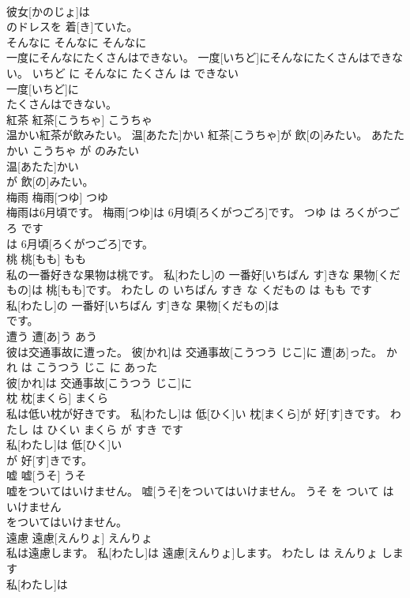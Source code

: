 \documentclass[8pt]{extreport}
\begin{document}
\begin{CJK}{UTF8}{min}
\\	彼女[かのじょ]は
\\	のドレスを 着[き]ていた。			
\\	そんなに	そんなに	そんなに	
\\	一度にそんなにたくさんはできない。	一度[いちど]にそんなにたくさんはできない。	いちど に そんなに たくさん は できない	
\\	一度[いちど]に
\\	たくさんはできない。			
\\	紅茶	紅茶[こうちゃ]	こうちゃ	
\\	温かい紅茶が飲みたい。	温[あたた]かい 紅茶[こうちゃ]が 飲[の]みたい。	あたたかい こうちゃ が のみたい	
\\	温[あたた]かい
\\	が 飲[の]みたい。			
\\	梅雨	梅雨[つゆ]	つゆ	
\\	梅雨は6月頃です。	梅雨[つゆ]は 6月頃[ろくがつごろ]です。	つゆ は ろくがつごろ です	
\\	は 6月頃[ろくがつごろ]です。			
\\	桃	桃[もも]	もも	
\\	私の一番好きな果物は桃です。	私[わたし]の 一番好[いちばん す]きな 果物[くだもの]は 桃[もも]です。	わたし の いちばん すき な くだもの は もも です	
\\	私[わたし]の 一番好[いちばん す]きな 果物[くだもの]は
\\	です。			
\\	遭う	遭[あ]う	あう	
\\	彼は交通事故に遭った。	彼[かれ]は 交通事故[こうつう じこ]に 遭[あ]った。	かれ は こうつう じこ に あった	
\\	彼[かれ]は 交通事故[こうつう じこ]に
\\	枕	枕[まくら]	まくら	
\\	私は低い枕が好きです。	私[わたし]は 低[ひく]い 枕[まくら]が 好[す]きです。	わたし は ひくい まくら が すき です	
\\	私[わたし]は 低[ひく]い
\\	が 好[す]きです。			
\\	嘘	嘘[うそ]	うそ	
\\	嘘をついてはいけません。	嘘[うそ]をついてはいけません。	うそ を ついて は いけません	
\\	をついてはいけません。			
\\	遠慮	遠慮[えんりょ]	えんりょ	
\\	私は遠慮します。	私[わたし]は 遠慮[えんりょ]します。	わたし は えんりょ します	
\\	私[わたし]は

\end{CJK}
\end{document}
